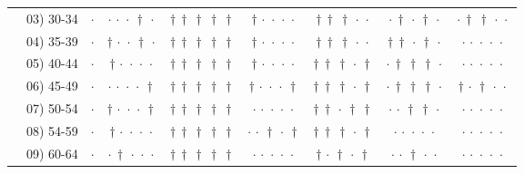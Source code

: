 {\begin{longtable}[t]{llccccccc}
 & 03) 30-34 & $\cdot$ & ${\cdot}\,{\cdot}\,{\cdot}\,{\dagger}\,{\cdot}$ & ${\dagger}\,{\dagger}\,{\dagger}\,{\dagger}\,{\dagger}$ & ${\dagger}\,{\cdot}\,{\cdot}\,{\cdot}\,{\cdot}$ & ${\dagger}\,{\dagger}\,{\dagger}\,{\cdot}\,{\cdot}$ & ${\cdot}\,{\dagger}\,{\cdot}\,{\dagger}\,{\cdot}$ & ${\cdot}\,{\dagger}\,{\dagger}\,{\cdot}\,{\cdot}$ \\
 & 04) 35-39 & $\cdot$ & ${\dagger}\,{\cdot}\,{\cdot}\,{\dagger}\,{\cdot}$ & ${\dagger}\,{\dagger}\,{\dagger}\,{\dagger}\,{\dagger}$ & ${\dagger}\,{\cdot}\,{\cdot}\,{\cdot}\,{\cdot}$ & ${\dagger}\,{\dagger}\,{\dagger}\,{\cdot}\,{\cdot}$ & ${\dagger}\,{\dagger}\,{\cdot}\,{\dagger}\,{\cdot}$ & ${\cdot}\,{\cdot}\,{\cdot}\,{\cdot}\,{\cdot}$ \\
 & 05) 40-44 & $\cdot$ & ${\dagger}\,{\cdot}\,{\cdot}\,{\cdot}\,{\cdot}$ & ${\dagger}\,{\dagger}\,{\dagger}\,{\dagger}\,{\dagger}$ & ${\dagger}\,{\cdot}\,{\cdot}\,{\cdot}\,{\cdot}$ & ${\dagger}\,{\dagger}\,{\dagger}\,{\cdot}\,{\dagger}$ & ${\cdot}\,{\dagger}\,{\dagger}\,{\dagger}\,{\cdot}$ & ${\cdot}\,{\cdot}\,{\cdot}\,{\cdot}\,{\cdot}$ \\
 & 06) 45-49 & $\cdot$ & ${\cdot}\,{\cdot}\,{\cdot}\,{\cdot}\,{\dagger}$ & ${\dagger}\,{\dagger}\,{\dagger}\,{\dagger}\,{\dagger}$ & ${\dagger}\,{\cdot}\,{\cdot}\,{\cdot}\,{\dagger}$ & ${\dagger}\,{\dagger}\,{\dagger}\,{\cdot}\,{\dagger}$ & ${\cdot}\,{\dagger}\,{\dagger}\,{\dagger}\,{\cdot}$ & ${\dagger}\,{\cdot}\,{\dagger}\,{\cdot}\,{\cdot}$ \\
 & 07) 50-54 & $\cdot$ & ${\dagger}\,{\cdot}\,{\cdot}\,{\cdot}\,{\dagger}$ & ${\dagger}\,{\dagger}\,{\dagger}\,{\dagger}\,{\dagger}$ & ${\cdot}\,{\cdot}\,{\cdot}\,{\cdot}\,{\cdot}$ & ${\dagger}\,{\dagger}\,{\cdot}\,{\dagger}\,{\dagger}$ & ${\cdot}\,{\cdot}\,{\dagger}\,{\dagger}\,{\cdot}$ & ${\cdot}\,{\cdot}\,{\cdot}\,{\cdot}\,{\cdot}$ \\
 & 08) 54-59 & $\cdot$ & ${\dagger}\,{\cdot}\,{\cdot}\,{\cdot}\,{\cdot}$ & ${\dagger}\,{\dagger}\,{\dagger}\,{\dagger}\,{\dagger}$ & ${\cdot}\,{\cdot}\,{\dagger}\,{\cdot}\,{\dagger}$ & ${\dagger}\,{\dagger}\,{\dagger}\,{\cdot}\,{\dagger}$ & ${\cdot}\,{\cdot}\,{\cdot}\,{\cdot}\,{\cdot}$ & ${\cdot}\,{\cdot}\,{\cdot}\,{\cdot}\,{\cdot}$ \\
 & 09) 60-64 & $\cdot$ & ${\cdot}\,{\dagger}\,{\cdot}\,{\cdot}\,{\cdot}$ & ${\dagger}\,{\dagger}\,{\dagger}\,{\dagger}\,{\dagger}$ & ${\cdot}\,{\cdot}\,{\cdot}\,{\cdot}\,{\cdot}$ & ${\dagger}\,{\cdot}\,{\dagger}\,{\cdot}\,{\dagger}$ & ${\cdot}\,{\cdot}\,{\dagger}\,{\cdot}\,{\cdot}$ & ${\cdot}\,{\cdot}\,{\cdot}\,{\cdot}\,{\cdot}$ \\

\end{longtable}}
